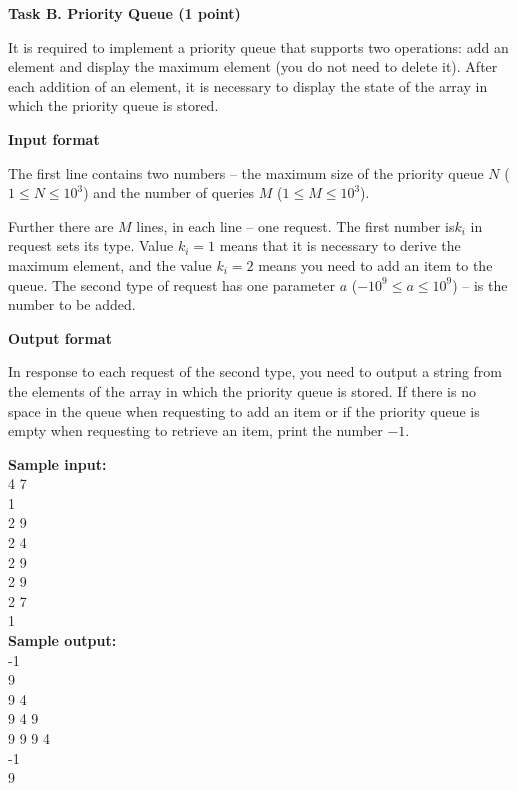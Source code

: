 \documentclass[a4paper]{article}
\begin{document}
\textbf{Task B. Priority Queue (1 point)}

\SPACE

It is required to implement a priority queue that supports two operations: add an element and display the maximum element (you do not need to delete it). After each addition of an element, it is necessary to display the state of the array in which the priority queue is stored.

\SPACE

\textbf{Input format}

The first line contains two numbers -- the maximum size of the priority queue $N$ ($1 \le N \le 10^3$) and the number of queries $M$ ($1 \le M \le 10^3$).

Further there are $M$ lines, in each line -- one request. The first number is$k_i$ in request sets its type. Value $k_i = 1$ means that it is necessary to derive the maximum element, and the value $k_i = 2$ means you need to add an item to the queue. The second type of request has one parameter $a$ ($-10^9 \le a \le 10^9$) -- is the number to be added.

\SPACE

\textbf{Output format}

In response to each request of the second type, you need to output a string from the elements of the array in which the priority queue is stored. If there is no space in the queue when requesting to add an item or if the priority queue is empty when requesting to retrieve an item, print the number $-1$.

\SPACE

\noindent \textbf{Sample input:}\\
4 7\\
1\\
2 9\\
2 4\\
2 9\\
2 9\\
2 7\\
1\\


\noindent \textbf{Sample output:}\\
-1\\
9\\
9 4\\
9 4 9\\
9 9 9 4\\
-1\\
9\\
\end{document}
